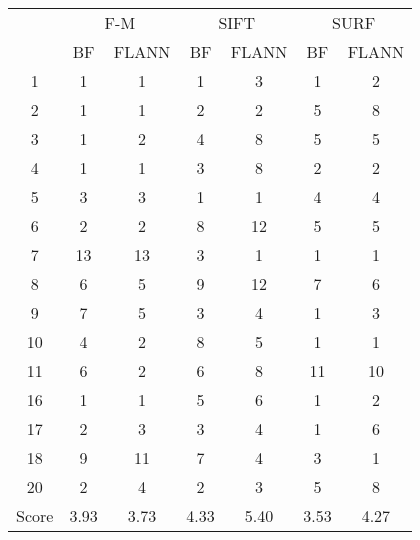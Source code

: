 \documentclass[draft,final]{vutinfth} %
\begin{document}
\begin{appendices}
\begin{minipage}{\linewidth}
\centering
\begin{tabular}{c|cc|cc|cc}
\multirow{2}{*}{ } & \multicolumn{2}{c}{ F-M } & \multicolumn{2}{c}{ SIFT } & \multicolumn{2}{c}{ SURF } \\
& BF & FLANN & BF & FLANN & BF & FLANN \\
\hline
1 & 1 & 1 & 1 & 3 & 1 & 2 \\
2 & 1 & 1 & 2 & 2 & 5 & 8 \\
3 & 1 & 2 & 4 & 8 & 5 & 5 \\
4 & 1 & 1 & 3 & 8 & 2 & 2 \\
5 & 3 & 3 & 1 & 1 & 4 & 4 \\
6 & 2 & 2 & 8 & 12 & 5 & 5 \\
7 & 13 & 13 & 3 & 1 & 1 & 1 \\
8 & 6 & 5 & 9 & 12 & 7 & 6 \\
9 & 7 & 5 & 3 & 4 & 1 & 3 \\
10 & 4 & 2 & 8 & 5 & 1 & 1 \\
11 & 6 & 2 & 6 & 8 & 11 & 10 \\
16 & 1 & 1 & 5 & 6 & 1 & 2 \\
17 & 2 & 3 & 3 & 4 & 1 & 6 \\
18 & 9 & 11 & 7 & 4 & 3 & 1 \\
20 & 2 & 4 & 2 & 3 & 5 & 8 \\
\hline
Score & 3.93 & 3.73 & 4.33 & 5.40 & 3.53 & 4.27 \\
\end{tabular}

 \label{tab:20Cent} 
\end{minipage}


\end{appendices}
\end{document}
